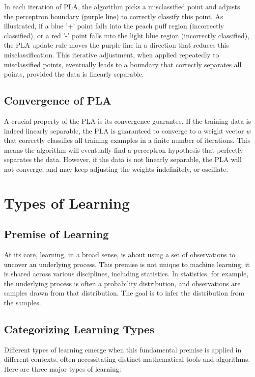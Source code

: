\documentclass{article}
\begin{document}
In each iteration of PLA, the algorithm picks a misclassified point and adjusts the perceptron boundary (purple line) to correctly classify this point. As illustrated, if a blue '+' point falls into the peach puff region (incorrectly classified), or a red '-' point falls into the light blue region (incorrectly classified), the PLA update rule moves the purple line in a direction that reduces this misclassification.  This iterative adjustment, when applied repeatedly to misclassified points, eventually leads to a boundary that correctly separates all points, provided the data is linearly separable.

\subsection{Convergence of PLA}
A crucial property of the PLA is its convergence guarantee. If the training data is indeed linearly separable, the PLA is guaranteed to converge to a weight vector $w$ that correctly classifies all training examples in a finite number of iterations. This means the algorithm will eventually find a perceptron hypothesis that perfectly separates the data. However, if the data is not linearly separable, the PLA will not converge, and may keep adjusting the weights indefinitely, or oscillate.

\section{Types of Learning}
\subsection{Premise of Learning}
At its core, learning, in a broad sense, is about using a set of observations to uncover an underlying process.  This premise is not unique to machine learning; it is shared across various disciplines, including statistics. In statistics, for example, the underlying process is often a probability distribution, and observations are samples drawn from that distribution. The goal is to infer the distribution from the samples.

\subsection{Categorizing Learning Types}
Different types of learning emerge when this fundamental premise is applied in different contexts, often necessitating distinct mathematical tools and algorithms.  Here are three major types of learning:
\end{document}
